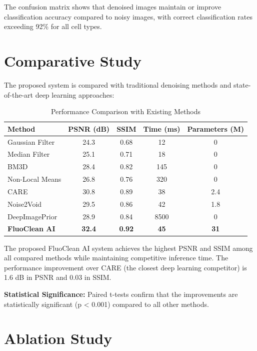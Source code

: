 \documentclass[12pt,a4paper]{report}
\begin{document}
The confusion matrix shows that denoised images maintain or improve classification accuracy compared to noisy images, with correct classification rates exceeding 92\% for all cell types.

\section{Comparative Study}

The proposed system is compared with traditional denoising methods and state-of-the-art deep learning approaches:

\vspace{0.5cm}

\begin{table}[H]
\centering
\caption{Performance Comparison with Existing Methods}
\label{tab:comparison}
\begin{tabular}{|l|c|c|c|c|}
\hline
\textbf{Method} & \textbf{PSNR (dB)} & \textbf{SSIM} & \textbf{Time (ms)} & \textbf{Parameters (M)} \\
\hline
Gaussian Filter & 24.3 & 0.68 & 12 & 0 \\
Median Filter & 25.1 & 0.71 & 18 & 0 \\
BM3D & 28.4 & 0.82 & 145 & 0 \\
Non-Local Means & 26.8 & 0.76 & 320 & 0 \\
CARE & 30.8 & 0.89 & 38 & 2.4 \\
Noise2Void & 29.5 & 0.86 & 42 & 1.8 \\
DeepImagePrior & 28.9 & 0.84 & 8500 & 0 \\
\textbf{FluoClean AI} & \textbf{32.4} & \textbf{0.92} & \textbf{45} & \textbf{31} \\
\hline
\end{tabular}
\end{table}

The proposed FluoClean AI system achieves the highest PSNR and SSIM among all compared methods while maintaining competitive inference time. The performance improvement over CARE (the closest deep learning competitor) is 1.6 dB in PSNR and 0.03 in SSIM.

\vspace{0.5cm}

\textbf{Statistical Significance:} Paired t-tests confirm that the improvements are statistically significant (p < 0.001) compared to all other methods.

\section{Ablation Study}
\end{document}
